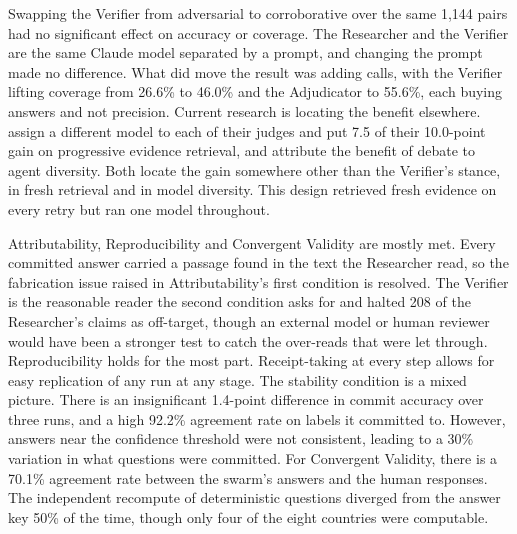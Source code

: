 Swapping the Verifier from adversarial to corroborative over the same 1,144 pairs had no significant effect on accuracy or coverage. The Researcher and the Verifier are the same Claude model separated by a prompt, and changing the prompt made no difference. What did move the result was adding calls, with the Verifier lifting coverage from 26.6\% to 46.0\% and the Adjudicator to 55.6\%, each buying answers and not precision. Current research is locating the benefit elsewhere. \citet{chowdhury2026} assign a different model to each of their judges and put 7.5 of their 10.0-point gain on progressive evidence retrieval, and \citet{zhu2026} attribute the benefit of debate to agent diversity. Both locate the gain somewhere other than the Verifier's stance, in fresh retrieval and in model diversity. This design retrieved fresh evidence on every retry but ran one model throughout.

Attributability, Reproducibility and Convergent Validity are mostly met. Every committed answer carried a passage found in the text the Researcher read, so the fabrication issue raised in Attributability's first condition is resolved. The Verifier is the reasonable reader the second condition asks for and halted 208 of the Researcher's claims as off-target, though an external model or human reviewer would have been a stronger test to catch the over-reads that were let through. Reproducibility holds for the most part. Receipt-taking at every step allows for easy replication of any run at any stage. The stability condition is a mixed picture. There is an insignificant 1.4-point difference in commit accuracy over three runs, and a high 92.2\% agreement rate on labels it committed to. However, answers near the confidence threshold were not consistent, leading to a 30\% variation in what questions were committed. For Convergent Validity, there is a 70.1\% agreement rate between the swarm's answers and the human responses. The independent recompute of deterministic questions diverged from the answer key 50\% of the time, though only four of the eight countries were computable.

